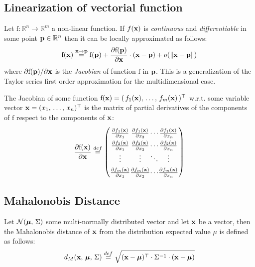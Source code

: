 	\subsection{Linearization of vectorial function}
		\label{app.jacobian}
		Let $\mathrm{f} : \mathbb{R}^n \rightarrow \mathbb{R}^m$ a non-linear function.
		If $f(\boldsymbol{\mathrm{{x}}})$ is \emph{continuous} and \emph{differentiable} in some point $\boldsymbol{\mathrm{{p}}} \in \mathbb{R}^n$ then it can be locally approximated as follows:
		\begin{equation}
			\mathrm{f}(\boldsymbol{\mathrm{{x}}}) \stackrel{\boldsymbol{\mathrm{{x}}} \rightarrow \boldsymbol{\mathrm{{p}}}}{=} \mathrm{f}(\boldsymbol{\mathrm{{p}}}) + \frac{\partial\mathrm{f}(\boldsymbol{\mathrm{{p}}})}{\partial\boldsymbol{\mathrm{{x}}}} \cdot (\boldsymbol{\mathrm{{x}}} - \boldsymbol{\mathrm{{p}}}) + o(\| \boldsymbol{\mathrm{{x}}} - \boldsymbol{\mathrm{{p}}} \|)
		\end{equation}
		where ${\partial\mathrm{f}(\boldsymbol{\mathrm{{p}}})}/{\partial\boldsymbol{\mathrm{{x}}}}$ is the \emph{Jacobian} of function $\mathrm{f}$ in $\boldsymbol{\mathrm{{p}}}$. This is a generalization of the Taylor series first order approximation for the multidimensional case. 
		
		The Jacobian of some function $\mathrm{f}(\boldsymbol{\mathrm{{x}}}) = (\, f_1(\boldsymbol{\mathrm{{x}}}),\, \ldots,\, f_m(\boldsymbol{\mathrm{{x}}}) \,)^\top$ w.r.t. some variable vector $\boldsymbol{\mathrm{{x}}} = (x_1,\, \ldots,\, x_n)^\top$ is the matrix of partial derivatives of the components of $\mathrm{f}$ respect to the components of $\boldsymbol{\mathrm{{x}}}$:
		\begin{equation}
			\arraycolsep=.1pt\def\arraystretch{1.5}
			\frac{\partial\mathrm{f}(\vect{x})}{\partial\vect{x}} \stackrel{def}{=}
			\left(\begin{array}{cccc}
				\frac{\partial f_1(\vect{x})}{\partial x_1} & \frac{\partial f_1(\vect{x})}{\partial x_2} & \cdots & \frac{\partial f_1(\vect{x})}{\partial x_n} \\
				\frac{\partial f_2(\vect{x})}{\partial x_1} & \frac{\partial f_2(\vect{x})}{\partial x_2} & \cdots & \frac{\partial f_2(\vect{x})}{\partial x_n} \\
				\vdots & \vdots & \ddots & \vdots \\
				\frac{\partial f_m(\vect{x})}{\partial x_1} & \frac{\partial f_m(\vect{x})}{\partial x_2} & \cdots & \frac{\partial f_m(\vect{x})}{\partial x_n} \\
			\end{array}\right)
		\end{equation}
	
	\subsection{Mahalonobis Distance}
		\label{app.mahalonobis}
		Let $\mathcal{N}(\boldsymbol{\mathrm{{\mu}}},\, \Sigma)$ some multi-normally distributed vector and let $\boldsymbol{\mathrm{{x}}}$ be a vector, then the Mahalonobis distance of $\boldsymbol{\mathrm{{x}}}$ from the distribution expected value $\mu$ is defined as follows:
		\begin{equation}
			d_M(\boldsymbol{\mathrm{{x}}},\, \boldsymbol{\mathrm{{\mu}}},\, \Sigma) \stackrel{def}{=} \sqrt{(\boldsymbol{\mathrm{{x}}} - \boldsymbol{\mathrm{{\mu}}})^\top \cdot \Sigma^{-1} \cdot (\boldsymbol{\mathrm{{x}}} - \boldsymbol{\mathrm{{\mu}}})}
		\end{equation} 
		
